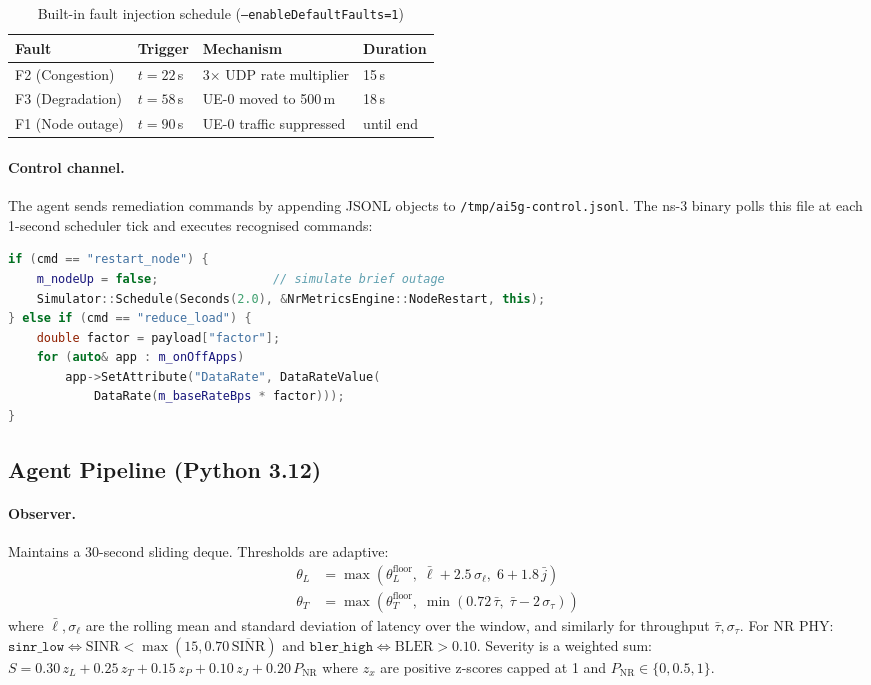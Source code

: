 \documentclass[12pt,a4paper]{article}
\begin{document}
\begin{table}[H]
\centering
\caption{Built-in fault injection schedule (\texttt{--enableDefaultFaults=1})}
\label{tab:faults}
\begin{tabular}{llll}
\toprule
\textbf{Fault} & \textbf{Trigger} & \textbf{Mechanism} & \textbf{Duration} \\
\midrule
F2 (Congestion)  & $t = 22$\,s & 3$\times$ UDP rate multiplier & 15\,s \\
F3 (Degradation) & $t = 58$\,s & UE-0 moved to 500\,m          & 18\,s \\
F1 (Node outage) & $t = 90$\,s & UE-0 traffic suppressed        & until end \\
\bottomrule
\end{tabular}
\end{table}

\paragraph{Control channel.}
The agent sends remediation commands by appending JSONL objects to
\texttt{/tmp/ai5g-control.jsonl}. The ns-3 binary polls this file at each
1-second scheduler tick and executes recognised commands:

\begin{lstlisting}[language=C++, caption={Supported control commands (C++ handler excerpt)}]
if (cmd == "restart_node") {
    m_nodeUp = false;                // simulate brief outage
    Simulator::Schedule(Seconds(2.0), &NrMetricsEngine::NodeRestart, this);
} else if (cmd == "reduce_load") {
    double factor = payload["factor"];
    for (auto& app : m_onOffApps)
        app->SetAttribute("DataRate", DataRateValue(
            DataRate(m_baseRateBps * factor)));
}
\end{lstlisting}

\subsection{Agent Pipeline (Python 3.12)}

\paragraph{Observer.}
Maintains a 30-second sliding deque. Thresholds are adaptive:
\begin{align}
  \theta_L &= \max\!\left(\theta_L^\text{floor},\;\bar{\ell} + 2.5\,\sigma_\ell,\;6 + 1.8\,\bar{j}\right) \label{eq:lat} \\
  \theta_T &= \max\!\left(\theta_T^\text{floor},\;\min\!\left(0.72\,\bar{\tau},\;\bar{\tau} - 2\,\sigma_\tau\right)\right) \label{eq:tput}
\end{align}
where $\bar{\ell}, \sigma_\ell$ are the rolling mean and standard deviation of
latency over the window, and similarly for throughput $\bar{\tau}, \sigma_\tau$.
For NR PHY: $\texttt{sinr\_low} \Leftrightarrow \mathrm{SINR} < \max(15, 0.70\,\overline{\mathrm{SINR}})$ and
$\texttt{bler\_high} \Leftrightarrow \mathrm{BLER} > 0.10$.
Severity is a weighted sum:
$S = 0.30\,z_L + 0.25\,z_T + 0.15\,z_P + 0.10\,z_J + 0.20\,P_\mathrm{NR}$
where $z_x$ are positive z-scores capped at 1 and $P_\mathrm{NR} \in \{0, 0.5, 1\}$.
\end{document}
